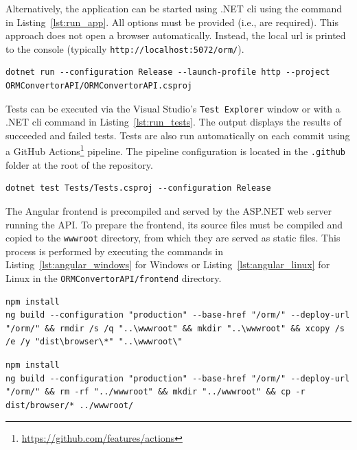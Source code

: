 Alternatively, the application can be started using .NET \acrshort{cli} using the command in Listing~\ref{lst:run_app}. All options must be provided (i.e., are required). This approach does not open a browser automatically. Instead, the local \acrshort{url} is printed to the console (typically \texttt{http://localhost:5072/orm/}).
\begin{lstlisting}[numbers=none,caption=Application launch command,label=lst:run_app]
dotnet run --configuration Release --launch-profile http --project ORMConvertorAPI/ORMConvertorAPI.csproj
\end{lstlisting}

Tests can be executed via the Visual Studio's \texttt{Test Explorer} window or with a .NET \acrshort{cli} command in Listing~\ref{lst:run_tests}. The output displays the results of succeeded and failed tests. Tests are also run automatically on each commit using a GitHub Actions\footnote{\url{https://github.com/features/actions}} pipeline. The pipeline configuration is located in the \texttt{.github} folder at the root of the repository.
\begin{lstlisting}[numbers=none,caption=Test execution command,label=lst:run_tests]
dotnet test Tests/Tests.csproj --configuration Release
\end{lstlisting}

The Angular frontend is precompiled and served by the ASP.NET web server running the API. To prepare the frontend, its source files must be compiled and copied to the \texttt{wwwroot} directory, from which they are served as static files. This process is performed by executing the commands in Listing~\ref{lst:angular_windows} for Windows or Listing~\ref{lst:angular_linux} for Linux in the \texttt{ORMConvertorAPI/frontend} directory.

\begin{lstlisting}[numbers=none,caption=Angular compilation commands (Windows),label=lst:angular_windows]
npm install
ng build --configuration "production" --base-href "/orm/" --deploy-url "/orm/" && rmdir /s /q "..\wwwroot" && mkdir "..\wwwroot" && xcopy /s /e /y "dist\browser\*" "..\wwwroot\"
\end{lstlisting}

\begin{lstlisting}[numbers=none,caption=Angular compilation commands (Linux),label=lst:angular_linux]
npm install
ng build --configuration "production" --base-href "/orm/" --deploy-url "/orm/" && rm -rf "../wwwroot" && mkdir "../wwwroot" && cp -r dist/browser/* ../wwwroot/
\end{lstlisting}

